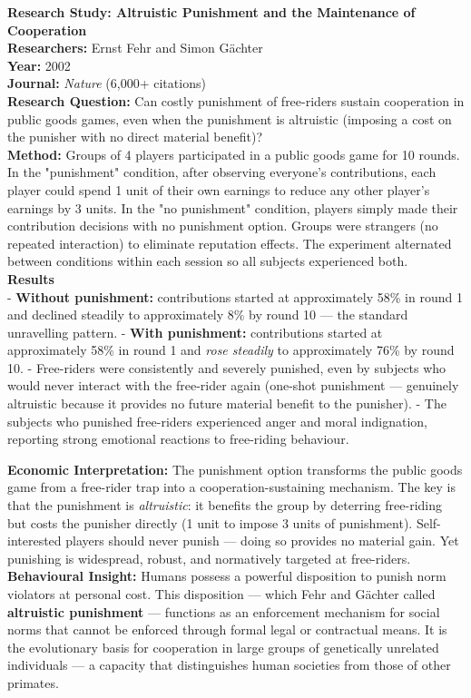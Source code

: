 \documentclass[12pt, letterpaper]{article}
\begin{document}
\begin{researchbox}
\textbf{Research Study: Altruistic Punishment and the Maintenance of Cooperation}\\[4pt]

\textbf{Researchers:} Ernst Fehr and Simon Gächter\\[4pt]
\textbf{Year:} 2002\\[4pt]
\textbf{Journal:} \textit{Nature} (6,000+ citations)\\[4pt]
\textbf{Research Question:} Can costly punishment of free-riders sustain cooperation in public goods games, even when the punishment is altruistic (imposing a cost on the punisher with no direct material benefit)?\\[4pt]
\textbf{Method:} Groups of 4 players participated in a public goods game for 10 rounds. In the "punishment" condition, after observing everyone's contributions, each player could spend 1 unit of their own earnings to reduce any other player's earnings by 3 units. In the "no punishment" condition, players simply made their contribution decisions with no punishment option. Groups were strangers (no repeated interaction) to eliminate reputation effects. The experiment alternated between conditions within each session so all subjects experienced both.\\[4pt]
\textbf{Results}\\[4pt]
- \textbf{Without punishment:} contributions started at approximately 58\% in round 1 and declined steadily to approximately 8\% by round 10 --- the standard unravelling pattern.
- \textbf{With punishment:} contributions started at approximately 58\% in round 1 and \textit{rose steadily} to approximately 76\% by round 10.
- Free-riders were consistently and severely punished, even by subjects who would never interact with the free-rider again (one-shot punishment --- genuinely altruistic because it provides no future material benefit to the punisher).
- The subjects who punished free-riders experienced anger and moral indignation, reporting strong emotional reactions to free-riding behaviour.

\textbf{Economic Interpretation:} The punishment option transforms the public goods game from a free-rider trap into a cooperation-sustaining mechanism. The key is that the punishment is \textit{altruistic}: it benefits the group by deterring free-riding but costs the punisher directly (1 unit to impose 3 units of punishment). Self-interested players should never punish --- doing so provides no material gain. Yet punishing is widespread, robust, and normatively targeted at free-riders.\\[4pt]

\textbf{Behavioural Insight:} Humans possess a powerful disposition to punish norm violators at personal cost. This disposition --- which Fehr and Gächter called \textbf{altruistic punishment} --- functions as an enforcement mechanism for social norms that cannot be enforced through formal legal or contractual means. It is the evolutionary basis for cooperation in large groups of genetically unrelated individuals --- a capacity that distinguishes human societies from those of other primates.\\[4pt]
\end{researchbox}
\end{document}
